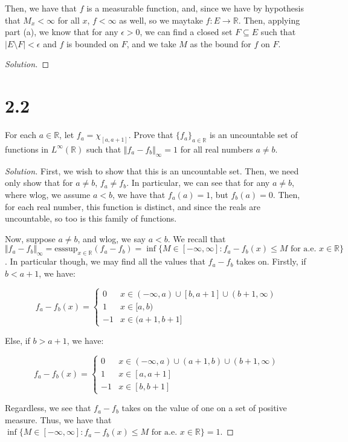 \documentclass[10pt]{article}
\newenvironment{problem}[2][Problem]{\begin{trivlist}
\item[\hskip \labelsep {\bfseries #1}\hskip \labelsep {\bfseries #2.}]}{\end{trivlist}}
\begin{document}
Then, we have that $f$ is a measurable function, and, since we have by hypothesis that $M_x < \infty$ for all $x$, $f < \infty$ as well, so we maytake $f : E \to \mathbb{R}$. Then, applying part (a), we know that for any $\epsilon > 0$, we can find a closed set $F \subseteq E$ such that $|E \setminus F| < \epsilon$ and $f$ is bounded on $F$, and we take $M$ as the bound for $f$ on $F$.
\begin{proof}[Solution]



\end{proof}

\section*{2.2}


\begin{problem}{3.3.9}
For each $a \in \mathbb{R}$, let $f_a = \chi_{[a,a+1]}$. Prove that $\{ f_a \}_{a \in \mathbb{R}}$ is an uncountable set of functions in $L^\infty(\mathbb{R})$ such that $\Vert f_a - f_b \Vert_\infty = 1$ for all real numbers $a \not = b$.
\end{problem}
\begin{proof}[Solution]

First, we wish to show that this is an uncountable set. Then, we need only show that for $a \not = b$, $f_a \not = f_b$. In particular, we can see that for any $a \not = b$, where wlog, we assume $a < b$, we have that $f_a(a) = 1$, but $f_b(a) = 0$. Then, for each real number, this function is distinct, and since the reals are uncountable, so too is this family of functions.

Now, suppose $a \not = b$, and wlog, we say $a < b$. We recall that $\Vert f_a - f_b \Vert_\infty = \text{esssup}_{x \in \mathbb{R}}(f_a - f_b) = \inf \{ M \in [-\infty,\infty] : f_a - f_b(x) \leq M \text{ for a.e. } x \in \mathbb{R} \}$. In particular though, we may find all the values that $f_a - f_b$ takes on. Firstly, if $b < a+1$, we have:

$$ f_a - f_b(x) = \begin{cases}
0 & x \in (-\infty,a) \cup [b,a+1] \cup (b+1,\infty) \\
1 & x \in  [a,b) \\
-1 & x \in (a+1,b+1]
\end{cases}$$

Else, if $b > a+1$, we have:

$$ f_a - f_b(x) = \begin{cases}
0 & x \in (-\infty,a) \cup (a+1,b) \cup (b+1,\infty) \\
1 & x \in  [a,a+1] \\
-1 & x \in [b,b+1]
\end{cases}$$

Regardless, we see that $f_a - f_b$ takes on the value of one on a set of positive measure. Thus, we have that $ \inf \{ M \in [-\infty,\infty] : f_a - f_b(x) \leq M \text{ for a.e. } x \in \mathbb{R} \} = 1$.


\end{proof}
\end{document}
